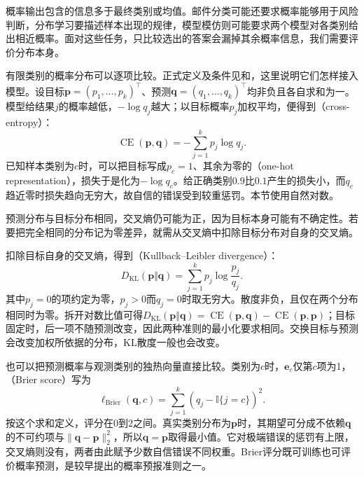 概率输出包含的信息多于最终类别或均值。邮件分类可能还要求概率能够用于风险判断，分布学习要描述样本出现的规律，模型模仿则可能要求两个模型对各类别给出相近概率。面对这些任务，只比较选出的答案会漏掉其余概率信息，我们需要评价分布本身。

有限类别的概率分布可以逐项比较。正式定义及条件见和，这里说明它们怎样接入模型。设目标$\bm p=(p_1,\ldots,p_k)^{\top}$、预测$\bm q=(q_1,\ldots,q_k)^{\top}$均非负且各自求和为一。模型给结果$j$的概率越低，$-\log q_j$越大；以目标概率$p_j$加权平均，便得到（cross-entropy）：
\begin{equation}
  \operatorname{CE}(\bm{p},\bm{q})=-\sum_{j=1}^{k}p_j\log q_j.
  \label{eq:models-cross-entropy}
\end{equation}
已知样本类别为$c$时，可以把目标写成$p_c=1$、其余为零的（one-hot representation），损失于是化为$-\log q_c$。给正确类别$0.9$比$0.1$产生的损失小，而$q_c$趋近零时损失趋向无穷大，故自信的错误受到较重惩罚。本节使用自然对数。

预测分布与目标分布相同，交叉熵仍可能为正，因为目标本身可能有不确定性。若要把完全相同的分布记为零差异，就需从交叉熵中扣除目标分布对自身的交叉熵。

扣除目标自身的交叉熵，得到（Kullback--Leibler divergence）：
\begin{equation}
  D_{\mathrm{KL}}(\bm{p}\Vert\bm{q})
  =\sum_{j=1}^{k}p_j\log\frac{p_j}{q_j}.
  \label{eq:models-kl}
\end{equation}
其中$p_j=0$的项约定为零，$p_j>0$而$q_j=0$时取无穷大。散度非负，且仅在两个分布相同时为零。拆开对数比值可得$D_{\mathrm{KL}}(\bm p\Vert\bm q)=\operatorname{CE}(\bm p,\bm q)-\operatorname{CE}(\bm p,\bm p)$；目标固定时，后一项不随预测改变，因此两种准则的最小化要求相同。交换目标与预测会改变加权所依据的分布，KL散度一般也会改变。

也可以把预测概率与观测类别的独热向量直接比较。类别为$c$时，$\bm e_c$仅第$c$项为1，（Brier score）写为
\begin{equation}
  \ell_{\mathrm{Brier}}(\bm{q},c)
  =\sum_{j=1}^{k}(q_j-\mathbb I\{j=c\})^2.
  \label{eq:models-brier}
\end{equation}
按这个求和定义，评分在$0$到$2$之间。真实类别分布为$\bm p$时，其期望可分成不依赖$\bm q$的不可约项与$\|\bm q-\bm p\|_2^2$，所以$\bm q=\bm p$取得最小值。它对极端错误的惩罚有上限，交叉熵则没有，两者由此赋予少数自信错误不同权重。Brier评分既可训练也可评价概率预测，是较早提出的概率预报准则之一。

